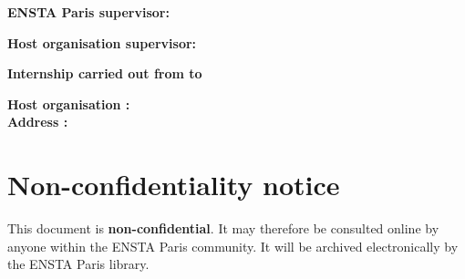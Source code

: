 \begin{titlepage}
\begin{center}
\vspace{0.8cm}

\noindent
\begin{minipage}[t]{0.48\textwidth}
  \raggedright\bfseries ENSTA Paris supervisor:\\ \enstaSupervisor
\end{minipage}
\hfill
\begin{minipage}[t]{0.48\textwidth}
  \raggedleft\bfseries Host organisation supervisor:\\ \hostSupervisor
\end{minipage}

\vspace{0.9cm}

{\bfseries Internship carried out from \dateFrom{} to \dateTo\par}

\vspace{0.5cm}

\noindent\begin{minipage}{\textwidth}\centering\bfseries
  Host organisation : \hostOrganisation\\
  Address : \hostAddress
\end{minipage}

\end{center}
\end{titlepage}

\thispagestyle{empty}
\mbox{}
\clearpage

\thispagestyle{empty}
\chapter*{Non-confidentiality notice}

\vspace{1cm}

\noindent This document is \textbf{non-confidential}. It may therefore be
consulted online by anyone within the ENSTA Paris community. It will be
archived electronically by the ENSTA Paris library.

\vspace{1.5cm}

